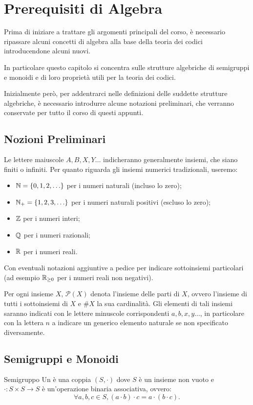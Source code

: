 \chapter{Prerequisiti di Algebra}

Prima di iniziare a trattare gli argomenti principali del corso,
è necessario ripassare alcuni concetti di algebra alla base della teoria dei codici introducendone alcuni nuovi.

In particolare questo capitolo si concentra sulle strutture algebriche di semigruppi e monoidi e di loro proprietà utili per la teoria dei codici.

Inizialmente però, per addentrarci nelle definizioni delle suddette strutture algebriche, è necessario introdurre alcune notazioni preliminari, che verranno conservate per tutto il corso di questi appunti.

\section{Nozioni Preliminari}

Le lettere maiuscole \(A, B, X, Y \ldots\) indicheranno generalmente insiemi, che siano finiti o infiniti.
Per quanto riguarda gli insiemi numerici tradizionali, useremo:
\begin{itemize}
  \item \(\N = \set{0,1,2,\ldots}\) per i numeri naturali (incluso lo zero);
  \item \(\N_+ = \set{1,2,3,\ldots}\) per i numeri naturali positivi (escluso lo zero);
  \item \(\mathbb{Z}\) per i numeri interi;
  \item \(\mathbb{Q}\) per i numeri razionali;
  \item \(\mathbb{R}\) per i numeri reali.
\end{itemize}
Con eventuali notazioni aggiuntive a pedice per indicare sottoinsiemi particolari (ad esempio \(\mathbb{R}_{\geq 0}\) per i numeri reali non negativi).

Per ogni insieme \(X\), \(\mathcal{P}(X)\) denota l'insieme delle parti di \(X\), ovvero l'insieme di tutti i sottoinsiemi di \(X\) e \(\#X\) la sua cardinalità.
Gli elementi di tali insiemi saranno indicati con le lettere minuscole corrispondenti \(a,b,x,y \ldots\), in particolare con la lettera \(n\) a indicare un generico elemento naturale se non specificato diversamente.

\section{Semigruppi e Monoidi}
\begin{definition}{Semigruppo}
  Un  è una coppia \((S, \cdot)\) dove \(S\) è un insieme non vuoto e \(\cdot : S \times S \to S\) è un'operazione binaria associativa, ovvero:
  \[\forall a,b,c \in S, (a \cdot b) \cdot c = a \cdot (b \cdot c).\]
\end{definition}

